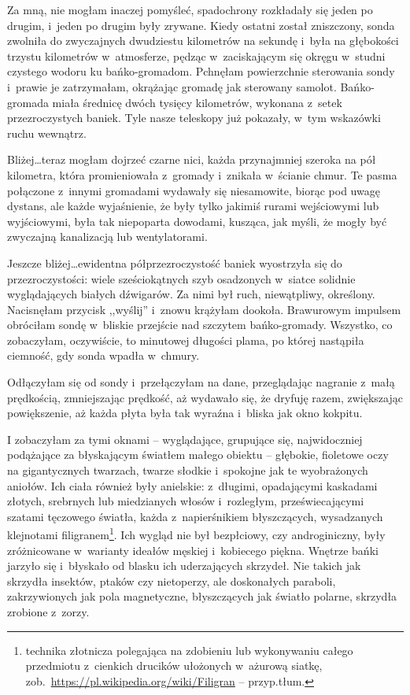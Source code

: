 \documentclass[oneside,polish,11pt,sfheadings]{mwbk}
\begin{document}
Za mną, nie mogłam inaczej pomyśleć, spadochrony rozkładały się jeden po
drugim, i~jeden po drugim były zrywane. Kiedy ostatni został zniszczony,
sonda zwolniła do zwyczajnych dwudziestu kilometrów na sekundę i~była na
głębokości trzystu kilometrów w~atmosferze, pędząc w~zaciskającym się
okręgu w~studni czystego wodoru ku bańko-gromadom. Pchnęłam powierzchnie
sterowania sondy i~prawie je zatrzymałam, okrążając gromadę jak
sterowany samolot. Bańko-gromada miała średnicę dwóch tysięcy
kilometrów, wykonana z~setek przezroczystych baniek. Tyle nasze
teleskopy już pokazały, w~tym wskazówki ruchu wewnątrz.

Bliżej\ldots  teraz mogłam dojrzeć czarne nici, każda przynajmniej szeroka
na pół kilometra, która promieniowała z~gromady i~znikała w~ścianie
chmur. Te pasma połączone z~innymi gromadami wydawały się niesamowite,
biorąc pod uwagę dystans, ale każde wyjaśnienie, że były tylko jakimiś
rurami wejściowymi lub wyjściowymi, była tak niepoparta dowodami,
kusząca, jak myśli, że mogły być zwyczajną kanalizacją lub
wentylatorami.

Jeszcze bliżej\ldots  ewidentna półprzezroczystość baniek wyostrzyła się do
przezroczystości: wiele sześciokątnych szyb osadzonych w~siatce solidnie
wyglądających białych dźwigarów. Za nimi był ruch, niewątpliwy,
określony. Nacisnęłam przycisk ,,wyślij'' i~znowu krążyłam dookoła.
Brawurowym impulsem obróciłam sondę w~bliskie przejście nad szczytem
bańko-gromady. Wszystko, co zobaczyłam, oczywiście, to minutowej
długości plama, po której nastąpiła ciemność, gdy sonda wpadła w~chmury.

Odłączyłam się od sondy i~przełączyłam na dane, przeglądając nagranie z~małą prędkością, zmniejszając prędkość, aż wydawało się, że dryfuję
razem, zwiększając powiększenie, aż każda płyta była tak wyraźna i~bliska jak okno kokpitu.

I zobaczyłam za tymi oknami -- wyglądające, grupujące się, najwidoczniej
podążające za błyskającym światłem małego obiektu -- głębokie, fioletowe
oczy na gigantycznych twarzach, twarze słodkie i~spokojne jak te
wyobrażonych aniołów. Ich ciała również były anielskie: z~długimi,
opadającymi kaskadami złotych, srebrnych lub miedzianych włosów i~rozległym, przeświecającymi szatami tęczowego światła, każda z~napierśnikiem błyszczących, wysadzanych klejnotami
filigranem\footnote{technika złotnicza polegająca na zdobieniu lub
wykonywaniu całego przedmiotu z~cienkich drucików ułożonych w~ażurową
siatkę, zob.~\url{https://pl.wikipedia.org/wiki/Filigran} -- przyp.tłum.}. Ich wygląd nie był bezpłciowy, czy androginiczny, były
zróżnicowane w~warianty ideałów męskiej i~kobiecego piękna. Wnętrze
bańki jarzyło się i~błyskało od blasku ich uderzających skrzydeł. Nie
takich jak skrzydła insektów, ptaków czy nietoperzy, ale doskonałych
paraboli, zakrzywionych jak pola magnetyczne, błyszczących jak światło
polarne, skrzydła zrobione z~zorzy.
\end{document}
